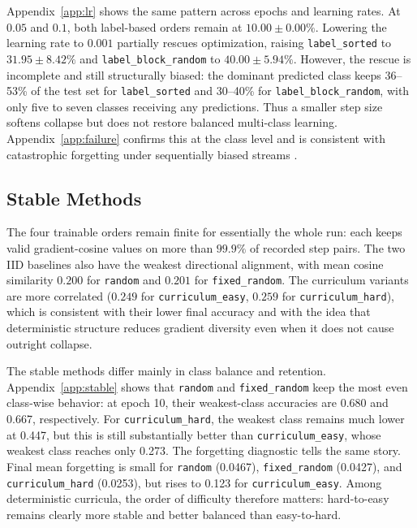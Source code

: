 \documentclass[conference]{IEEEtran}
\begin{document}
Appendix~\ref{app:lr} shows the same pattern across epochs and learning
rates.
At $0.05$ and $0.1$, both label-based orders remain at
$10.00\pm0.00\%$.
Lowering the learning rate to $0.001$ partially rescues optimization,
raising \texttt{label\_sorted} to $31.95\pm8.42\%$ and
\texttt{label\_block\_random} to $40.00\pm5.94\%$.
However, the rescue is incomplete and still structurally biased:
the dominant predicted class keeps 36--53\% of the test set for
\texttt{label\_sorted} and 30--40\% for
\texttt{label\_block\_random}, with only five to seven classes receiving
any predictions.
Thus a smaller step size softens collapse but does not restore balanced
multi-class learning.
Appendix~\ref{app:failure} confirms this at the class level and is
consistent with catastrophic forgetting under sequentially biased streams
\cite{mccloskey1989}.

\subsection{Stable Methods}
The four trainable orders remain finite for essentially the whole run:
each keeps valid gradient-cosine values on more than $99.9\%$ of recorded
step pairs.
The two IID baselines also have the weakest directional alignment, with
mean cosine similarity $0.200$ for \texttt{random} and $0.201$ for
\texttt{fixed\_random}.
The curriculum variants are more correlated
($0.249$ for \texttt{curriculum\_easy}, $0.259$ for
\texttt{curriculum\_hard}), which is consistent with their lower final
accuracy and with the idea that deterministic structure reduces gradient
diversity even when it does not cause outright collapse.

The stable methods differ mainly in class balance and retention.
Appendix~\ref{app:stable} shows that \texttt{random} and
\texttt{fixed\_random} keep the most even class-wise behavior: at epoch 10,
their weakest-class accuracies are 0.680 and 0.667, respectively.
For \texttt{curriculum\_hard}, the weakest class remains much lower at
0.447, but this is still substantially better than
\texttt{curriculum\_easy}, whose weakest class reaches only 0.273.
The forgetting diagnostic tells the same story.
Final mean forgetting is small for \texttt{random} (0.0467),
\texttt{fixed\_random} (0.0427), and \texttt{curriculum\_hard} (0.0253),
but rises to 0.123 for \texttt{curriculum\_easy}.
Among deterministic curricula, the order of difficulty therefore matters:
hard-to-easy remains clearly more stable and better balanced than
easy-to-hard.
\end{document}

